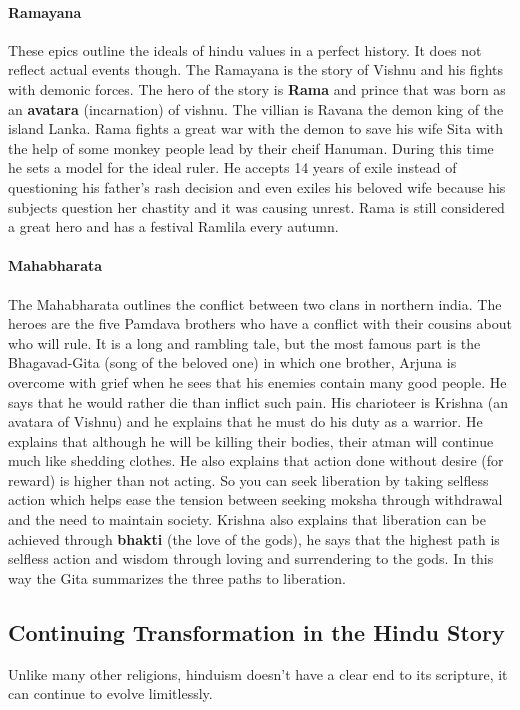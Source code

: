 \documentclass{article}
\begin{document}
\paragraph{Ramayana}
\label{par:ramayana}
These epics outline the ideals of hindu values in a perfect history. It does not reflect actual events though. The Ramayana is the story of Vishnu and his fights with demonic forces. The hero of the story is \textbf{Rama} and prince that was born as an \textbf{avatara} (incarnation) of vishnu. The villian is Ravana the demon king of the island Lanka. Rama fights a great war with the demon to save his wife Sita with the help of some monkey people lead by their cheif Hanuman. During this time he sets a model for the ideal ruler. He accepts 14 years of exile instead of questioning his father's rash decision and even exiles his beloved wife because his subjects question her chastity and it was causing unrest. Rama is still considered a great hero and has a festival Ramlila every autumn.

\paragraph{Mahabharata}
\label{par:mahabharata}
The Mahabharata outlines the conflict between two clans in northern india. The heroes are the five Pamdava brothers who have a conflict with their cousins about who will rule. It is a long and rambling tale, but the most famous part is the Bhagavad-Gita (song of the beloved one) in which one brother, Arjuna is overcome with grief when he sees that his enemies contain many good people. He says that he would rather die than inflict such pain. His charioteer is Krishna (an avatara of Vishnu) and he explains that he must do his duty as a warrior. He explains that although he will be killing their bodies, their atman will continue much like shedding clothes. He also explains that action done without desire (for reward) is higher than not acting. So you can seek liberation by taking selfless action which helps ease the tension between seeking moksha through withdrawal and the need to maintain society. Krishna also explains that liberation can be achieved through \textbf{bhakti} (the love of the gods), he says that the highest path is selfless action and wisdom through loving and surrendering to the gods. In this way the Gita summarizes the three paths to liberation.

\subsection{Continuing Transformation in the Hindu Story}
\label{sub:continuing_transformation_in_the_hindu_story}
Unlike many other religions, hinduism doesn't have a clear end to its scripture, it can continue to evolve limitlessly.
\end{document}
